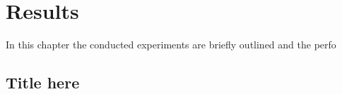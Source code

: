 \chapter{Results}
\label{sec:results}

In this chapter the conducted experiments are briefly outlined and the perfo


\section{Title here}


